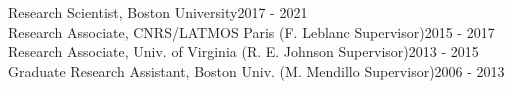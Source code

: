 \documentclass[12pt]{report}
\begin{document}
\noindent Research Scientist, Boston University\hfill 2017 - 2021\\
\noindent Research Associate, CNRS/LATMOS Paris (F. Leblanc Supervisor)\hfill 2015 - 2017\\
\noindent Research Associate, Univ. of Virginia (R. E. Johnson Supervisor)\hfill 2013 - 2015\\
\noindent Graduate Research Assistant, Boston Univ. (M. Mendillo Supervisor)\hfill 2006 - 2013\\
\end{document}

